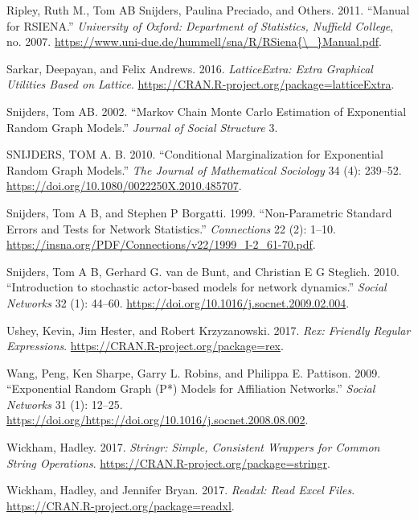\documentclass[]{book}
\begin{document}
\leavevmode\hypertarget{ref-Ripley2011}{}%
Ripley, Ruth M., Tom AB Snijders, Paulina Preciado, and Others. 2011. ``Manual for RSIENA.'' \emph{University of Oxford: Department of Statistics, Nuffield College}, no. 2007. \href{https://www.uni-due.de/hummell/sna/R/RSiena\%7B/_\%7DManual.pdf}{https://www.uni-due.de/hummell/sna/R/RSiena\{\textbackslash{}\_\}Manual.pdf}.

\leavevmode\hypertarget{ref-R-latticeExtra}{}%
Sarkar, Deepayan, and Felix Andrews. 2016. \emph{LatticeExtra: Extra Graphical Utilities Based on Lattice}. \url{https://CRAN.R-project.org/package=latticeExtra}.

\leavevmode\hypertarget{ref-Snijders2002}{}%
Snijders, Tom AB. 2002. ``Markov Chain Monte Carlo Estimation of Exponential Random Graph Models.'' \emph{Journal of Social Structure} 3.

\leavevmode\hypertarget{ref-Snijders2010margin}{}%
SNIJDERS, TOM A. B. 2010. ``Conditional Marginalization for Exponential Random Graph Models.'' \emph{The Journal of Mathematical Sociology} 34 (4): 239--52. \url{https://doi.org/10.1080/0022250X.2010.485707}.

\leavevmode\hypertarget{ref-Snijders1999}{}%
Snijders, Tom A B, and Stephen P Borgatti. 1999. ``Non-Parametric Standard Errors and Tests for Network Statistics.'' \emph{Connections} 22 (2): 1--10. \url{https://insna.org/PDF/Connections/v22/1999_I-2_61-70.pdf}.

\leavevmode\hypertarget{ref-Snijders2010}{}%
Snijders, Tom A B, Gerhard G. van de Bunt, and Christian E G Steglich. 2010. ``Introduction to stochastic actor-based models for network dynamics.'' \emph{Social Networks} 32 (1): 44--60. \url{https://doi.org/10.1016/j.socnet.2009.02.004}.

\leavevmode\hypertarget{ref-R-rex}{}%
Ushey, Kevin, Jim Hester, and Robert Krzyzanowski. 2017. \emph{Rex: Friendly Regular Expressions}. \url{https://CRAN.R-project.org/package=rex}.

\leavevmode\hypertarget{ref-Wang2009}{}%
Wang, Peng, Ken Sharpe, Garry L. Robins, and Philippa E. Pattison. 2009. ``Exponential Random Graph (P*) Models for Affiliation Networks.'' \emph{Social Networks} 31 (1): 12--25. \url{https://doi.org/https://doi.org/10.1016/j.socnet.2008.08.002}.

\leavevmode\hypertarget{ref-R-stringr}{}%
Wickham, Hadley. 2017. \emph{Stringr: Simple, Consistent Wrappers for Common String Operations}. \url{https://CRAN.R-project.org/package=stringr}.

\leavevmode\hypertarget{ref-R-readxl}{}%
Wickham, Hadley, and Jennifer Bryan. 2017. \emph{Readxl: Read Excel Files}. \url{https://CRAN.R-project.org/package=readxl}.
\end{document}
